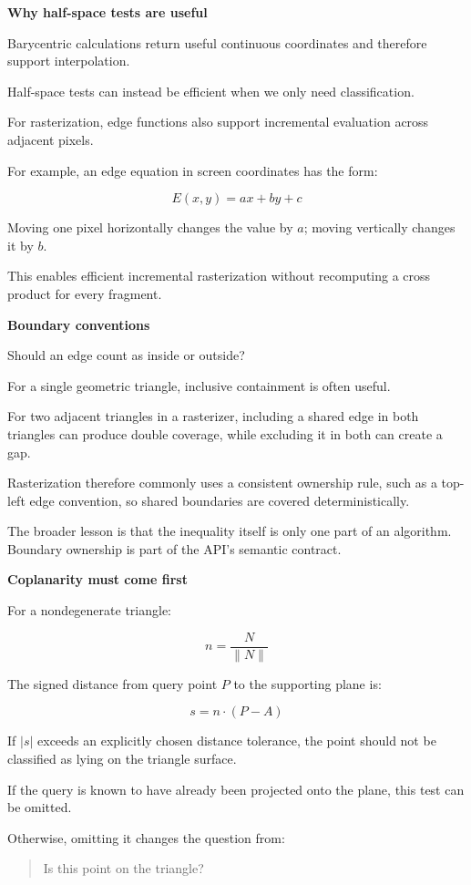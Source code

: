 \textbf{Why half-space tests are useful}

Barycentric calculations return useful continuous coordinates and therefore support interpolation.

Half-space tests can instead be efficient when we only need classification.

For rasterization, edge functions also support incremental evaluation across adjacent pixels.

For example, an edge equation in screen coordinates has the form:

\[
E(x,y)=ax+by+c
\]

Moving one pixel horizontally changes the value by \(a\); moving vertically changes it by \(b\).

This enables efficient incremental rasterization without recomputing a cross product for every fragment.

\textbf{Boundary conventions}

Should an edge count as inside or outside?

For a single geometric triangle, inclusive containment is often useful.

For two adjacent triangles in a rasterizer, including a shared edge in both triangles can produce double coverage, while excluding it in both can create a gap.

Rasterization therefore commonly uses a consistent ownership rule, such as a top-left edge convention, so shared boundaries are covered deterministically.

The broader lesson is that the inequality itself is only one part of an algorithm. Boundary ownership is part of the API's semantic contract.

\textbf{Coplanarity must come first}

For a nondegenerate triangle:

\[
n=\frac{N}{\|N\|}
\]

The signed distance from query point \(P\) to the supporting plane is:

\[
s=n\cdot(P-A)
\]

If \(|s|\) exceeds an explicitly chosen distance tolerance, the point should not be classified as lying on the triangle surface.

If the query is known to have already been projected onto the plane, this test can be omitted.

Otherwise, omitting it changes the question from:

\begin{quote}
Is this point on the triangle?
\end{quote}

